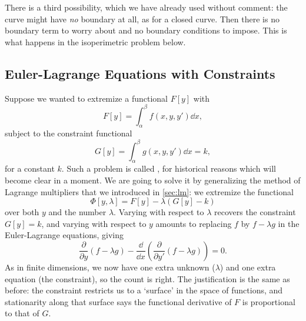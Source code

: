 \documentclass[a4paper]{scrartcl}
\begin{document}
\begin{remark}
	There is a third possibility, which we have already used without comment: the curve might have \emph{no} boundary at all, as for a closed curve. Then there is no boundary term to worry about and no boundary conditions to impose. This is what happens in the isoperimetric problem below.
\end{remark}

\subsection{Euler-Lagrange Equations with Constraints}

Suppose we wanted to extremize a functional $F[y]$ with
$$
F[y] = \int_{\alpha}^{\beta} f(x, y, y') \dd x,
$$
subject to the constraint functional
$$
G[y] = \int_{\alpha}^{\beta} g(x, y, y') \dd x = k,
$$
for a constant $k$. Such a problem is called , for historical reasons which will become clear in a moment. We are going to solve it by generalizing the method of Lagrange multipliers that we introduced in \autoref{sec:lm}: we extremize the functional
$$
\Phi[y, \lambda] = F[y] - \lambda \left(G[y] - k\right)
$$
over both $y$ and the number $\lambda$. Varying with respect to $\lambda$ recovers the constraint $G[y] = k$, and varying with respect to $y$ amounts to replacing $f$ by $f - \lambda g$ in the Euler-Lagrange equations, giving
$$
\frac{\partial}{\partial y}\left(f - \lambda g\right) - \frac{\dd}{\dd x}\left(\frac{\partial }{\partial y'}\left(f - \lambda g\right)\right) = 0.
$$
As in finite dimensions, we now have one extra unknown ($\lambda$) and one extra equation (the constraint), so the count is right. The justification is the same as before: the constraint restricts us to a `surface' in the space of functions, and stationarity along that surface says the functional derivative of $F$ is proportional to that of $G$.
\end{document}

